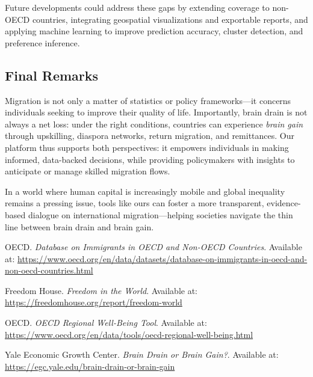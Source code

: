 \documentclass[11pt]{article}
\begin{document}
\medskip
\noindent
Future developments could address these gaps by extending coverage to non-OECD countries, integrating geospatial visualizations and exportable reports, and applying machine learning to improve prediction accuracy, cluster detection, and preference inference.

\subsection{Final Remarks}

\noindent
Migration is not only a matter of statistics or policy frameworks—it concerns individuals seeking to improve their quality of life. Importantly, brain drain is not always a net loss: under the right conditions, countries can experience \textit{brain gain} through upskilling, diaspora networks, return migration, and remittances. Our platform thus supports both perspectives: it empowers individuals in making informed, data-backed decisions, while providing policymakers with insights to anticipate or manage skilled migration flows.

\medskip
\noindent
In a world where human capital is increasingly mobile and global inequality remains a pressing issue, tools like ours can foster a more transparent, evidence-based dialogue on international migration—helping societies navigate the thin line between brain drain and brain gain.


\newpage



\begin{thebibliography}{9}

OECD. \textit{Database on Immigrants in OECD and Non-OECD Countries}.  
Available at: \url{https://www.oecd.org/en/data/datasets/database-on-immigrants-in-oecd-and-non-oecd-countries.html}  

Freedom House. \textit{Freedom in the World}.  
Available at: \url{https://freedomhouse.org/report/freedom-world}  

OECD. \textit{OECD Regional Well-Being Tool}.  
Available at: \url{https://www.oecd.org/en/data/tools/oecd-regional-well-being.html}  

Yale Economic Growth Center. \textit{Brain Drain or Brain Gain?}.  
Available at: \url{https://egc.yale.edu/brain-drain-or-brain-gain}  

\end{thebibliography}
\end{document}
